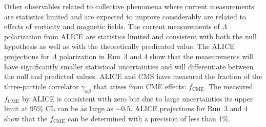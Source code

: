 Other observables related to collective phenomena where current 
  measurements are statistics limited and are expected to improve 
  considerably are related to effects of vorticity and magnetic fields.
%
The current measurements of $\Lambda$ polarization from ALICE are statistics limited
  and consistent with both the null hypothesis as well as with the theoretically
  predicated value.
The ALICE projections for $\Lambda$ polarization in Run~3 and 4 show that 
  the measurements will have significantly smaller statistical uncertainties 
  and will differentiate between the null and predicted values. 
%
ALICE and CMS have measured the fraction of the three-particle correlator
  $\gamma_{\alpha\beta}$ that arises from CME effects: $f_{\mathrm{CME}}$.
The measured $f_{\mathrm{CME}}$ by ALICE is consistent with zero but due to 
  large uncertainties its upper limit at 95\% CL can be as large as $\sim$0.5.
ALICE projections for Run~3 and 4 show that the $f_{\mathrm{CME}}$ can 
  be determined with a precision of less than 1\%.


















